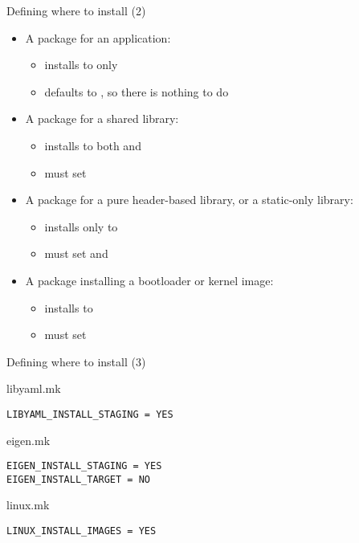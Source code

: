 \begin{frame}[fragile]{Defining where to install (2)}

  \begin{itemize}
  \item A package for an application:
    \begin{itemize}
    \item installs to  only
    \item {} defaults to , so there
      is nothing to do
    \end{itemize}
  \item A package for a shared library:
    \begin{itemize}
    \item installs to both  and 
    \item must set 
    \end{itemize}
  \item A package for a pure header-based library, or a static-only
    library:
    \begin{itemize}
    \item installs only to 
    \item must set  and
  \end{itemize}
  \item A package installing a bootloader or kernel image:
    \begin{itemize}
    \item installs to 
    \item must set 
    \end{itemize}
  \end{itemize}
\end{frame}

\begin{frame}[fragile]{Defining where to install (3)}
  \begin{block}{libyaml.mk}
    \begin{verbatim}
LIBYAML_INSTALL_STAGING = YES
    \end{verbatim}
  \end{block}

  \begin{block}{eigen.mk}
    \begin{verbatim}
EIGEN_INSTALL_STAGING = YES
EIGEN_INSTALL_TARGET = NO
    \end{verbatim}
  \end{block}

  \begin{block}{linux.mk}
    \begin{verbatim}
LINUX_INSTALL_IMAGES = YES
    \end{verbatim}
  \end{block}
\end{frame}

